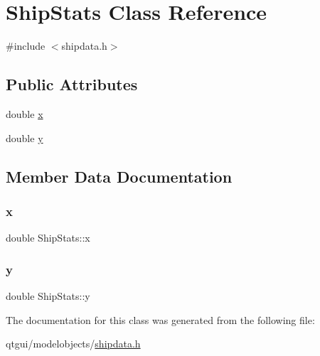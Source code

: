 \hypertarget{class_ship_stats}{}\section{Ship\+Stats Class Reference}
\label{class_ship_stats}


{\ttfamily \#include $<$shipdata.\+h$>$}

\subsection*{Public Attributes}
\begin{DoxyCompactItemize}
\item 
double \mbox{\hyperlink{class_ship_stats_a7c063301c14d09491fdc059872bea436}{x}}
\item 
double \mbox{\hyperlink{class_ship_stats_ad0e0913e8c71a179362e1921fc151728}{y}}
\end{DoxyCompactItemize}


\subsection{Member Data Documentation}
\mbox{\label{class_ship_stats_a7c063301c14d09491fdc059872bea436}} 
\subsubsection{\texorpdfstring{x}{x}}
{\footnotesize\ttfamily double Ship\+Stats\+::x}

\mbox{\label{class_ship_stats_ad0e0913e8c71a179362e1921fc151728}} 
\subsubsection{\texorpdfstring{y}{y}}
{\footnotesize\ttfamily double Ship\+Stats\+::y}



The documentation for this class was generated from the following file\+:\begin{DoxyCompactItemize}
\item 
qtgui/modelobjects/\mbox{\hyperlink{shipdata_8h}{shipdata.\+h}}\end{DoxyCompactItemize}

